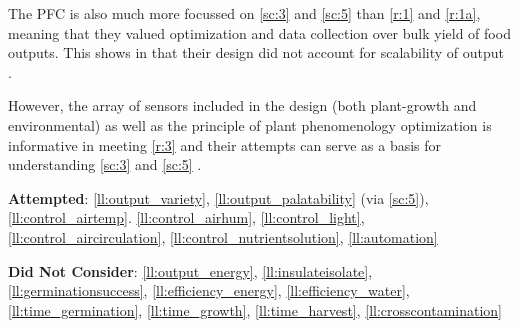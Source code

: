 \documentclass{report}
\begin{document}
The PFC is also much more focussed on \ref{sc:3} and \ref{sc:5} than \ref{r:1} and \ref{r:1a}, meaning that they valued optimization and data collection over bulk yield of food outputs. This shows in that their design did not account for scalability of output \cite{mit-wfp}.

However, the array of sensors included in the design (both plant-growth and environmental) as well as the principle of plant phenomenology optimization is informative in meeting \ref{r:3} and their attempts can serve as a basis for understanding \ref{sc:3} and \ref{sc:5} \cite{mit-openag}.

\textbf{Attempted}: \ref{ll:output_variety}, \ref{ll:output_palatability} (via \ref{sc:5}), \ref{ll:control_airtemp}. \ref{ll:control_airhum}, \ref{ll:control_light}, \ref{ll:control_aircirculation}, \ref{ll:control_nutrientsolution}, \ref{ll:automation}

\textbf{Did Not Consider}: \ref{ll:output_energy}, \ref{ll:insulateisolate}, \ref{ll:germinationsuccess}, \ref{ll:efficiency_energy}, \ref{ll:efficiency_water}, \ref{ll:time_germination}, \ref{ll:time_growth}, \ref{ll:time_harvest}, \ref{ll:crosscontamination}

\newpage



\end{document}
